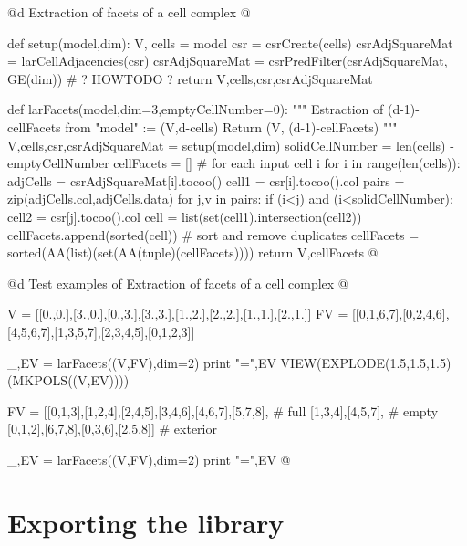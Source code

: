\documentclass[11pt,oneside]{article}	%
\begin{document}
@d Extraction of facets of a cell complex
@{def setup(model,dim):
    V, cells = model
    csr = csrCreate(cells)
    csrAdjSquareMat = larCellAdjacencies(csr)
    csrAdjSquareMat = csrPredFilter(csrAdjSquareMat, GE(dim)) # ? HOWTODO ?
    return V,cells,csr,csrAdjSquareMat

def larFacets(model,dim=3,emptyCellNumber=0):
    """
        Estraction of (d-1)-cellFacets from "model" := (V,d-cells)
        Return (V, (d-1)-cellFacets)
		"""
    V,cells,csr,csrAdjSquareMat = setup(model,dim)
    solidCellNumber = len(cells) - emptyCellNumber
    cellFacets = []
    # for each input cell i
    for i in range(len(cells)):
        adjCells = csrAdjSquareMat[i].tocoo()
        cell1 = csr[i].tocoo().col
        pairs = zip(adjCells.col,adjCells.data)
        for j,v in pairs:
            if (i<j) and (i<solidCellNumber):
                cell2 = csr[j].tocoo().col
                cell = list(set(cell1).intersection(cell2))
                cellFacets.append(sorted(cell))
    # sort and remove duplicates
    cellFacets = sorted(AA(list)(set(AA(tuple)(cellFacets))))
    return V,cellFacets
@}
@d Test examples of Extraction of facets of a cell complex
@{V = [[0.,0.],[3.,0.],[0.,3.],[3.,3.],[1.,2.],[2.,2.],[1.,1.],[2.,1.]]
FV = [[0,1,6,7],[0,2,4,6],[4,5,6,7],[1,3,5,7],[2,3,4,5],[0,1,2,3]]

_,EV = larFacets((V,FV),dim=2)
print "\nEV =",EV
VIEW(EXPLODE(1.5,1.5,1.5)(MKPOLS((V,EV))))

FV = [[0,1,3],[1,2,4],[2,4,5],[3,4,6],[4,6,7],[5,7,8], # full
	[1,3,4],[4,5,7], # empty
	[0,1,2],[6,7,8],[0,3,6],[2,5,8]] # exterior
		
_,EV = larFacets((V,FV),dim=2)
print "\nEV =",EV
@}

\section{Exporting the library}
\end{document}
